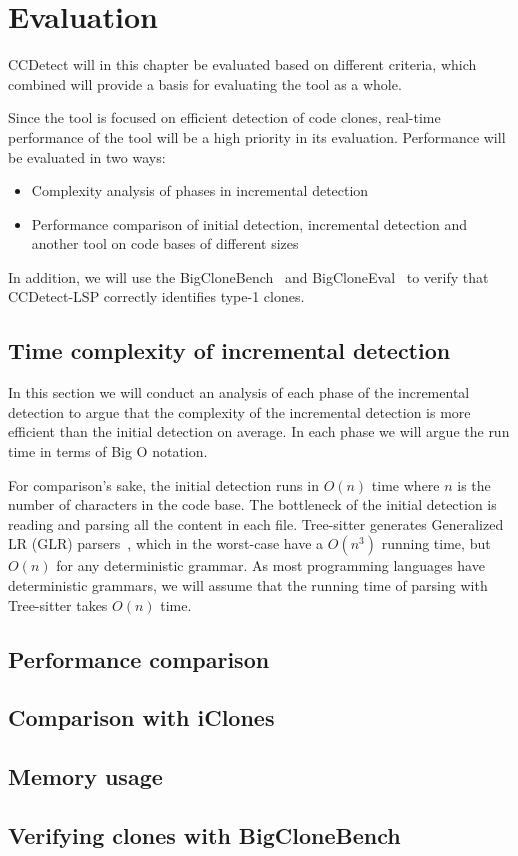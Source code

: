 \chapter{Evaluation}


CCDetect will in this chapter be evaluated based on different criteria, which combined
will provide a basis for evaluating the tool as a whole.

Since the tool is focused on efficient detection of code clones, real-time performance of
the tool will be a high priority in its evaluation. Performance will be evaluated in
two ways:

\begin{itemize}
    \item Complexity analysis of phases in incremental detection
    \item Performance comparison of initial detection, incremental detection and another
        tool on code bases of different sizes
\end{itemize}

In addition, we will use the BigCloneBench~\cite{BigCloneBench} and
BigCloneEval~\cite{BigCloneEval} to verify that CCDetect-LSP correctly identifies type-1
clones.

\section{Time complexity of incremental detection}

In this section we will conduct an analysis of each phase of the incremental detection to
argue that the complexity of the incremental detection is more efficient than the initial
detection on average. In each phase we will argue the run time in terms of Big O notation.

For comparison's sake, the initial detection runs in $O(n)$ time where $n$ is the number of
characters in the code base. The bottleneck of the initial detection is reading and
parsing all the content in each file. Tree-sitter generates Generalized LR (GLR)
parsers~\cite{GLR}, which in the worst-case have a $O(n^3)$ running time, but $O(n)$ for
any deterministic grammar. As most programming languages have deterministic grammars, we
will assume that the running time of parsing with Tree-sitter takes $O(n)$ time.

\section{Performance comparison}


\section{Comparison with iClones}

\section{Memory usage}

\section{Verifying clones with BigCloneBench}
